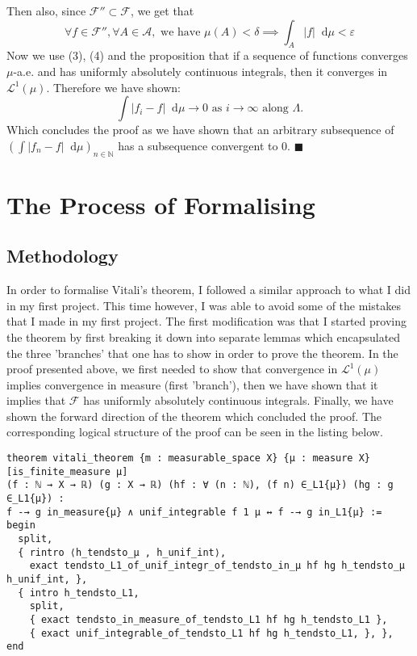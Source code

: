 \documentclass[11pt]{article}
\newenvironment{code}{\captionsetup{type=listing}}{}
\newcommand\N{\mathbb{N}}
\newcommand\Lmu{\mathcal{L}^1(\mu)}
\newcommand\weh{\text{ we have }}
\newcommand\as{\text{ as }}
\newcommand*\diff{\mathop{}\!\mathrm{d}}
\renewcommand\qedsymbol{$\blacksquare$}
\begin{document}
Then also, since $\mathcal{F}'' \subset \mathcal{F}$, we get that
\begin{equation}
\forall f \in \mathcal{F''},
  \forall A \in \mathcal{A}, \weh \mu(A) < \delta \implies \int_A |f|\diff \mu < \varepsilon
\end{equation}
Now we use (3), (4) and the proposition that if a sequence of functions converges $\mu$-a.e.
and has uniformly absolutely continuous integrals, then it converges in  $\Lmu$.
Therefore we have shown:
\[
  \int |f_{i} - f| \diff\mu \to 0 \as i \to \infty \text{ along } \Lambda
.\]
Which concludes the proof as we have shown that an arbitrary subsequence of
$(\int |f_{n} - f| \diff\mu)_{n\in\N} $ has a subsequence convergent to 0. \hfill \qedsymbol

\section*{The Process of Formalising}
\subsection*{Methodology}

In order to formalise Vitali's theorem, I followed a similar approach to what
I did in my first project. This time however, I was able to avoid some of the mistakes that
I made in my first project. The first modification was that I started proving the
theorem by first breaking it down into separate lemmas which encapsulated the
three 'branches' that one has to show in order to prove the theorem. In the proof
presented above, we first needed to show that
convergence in $\Lmu$ implies convergence in measure (first 'branch'), then we have shown that
it implies that  $\mathcal{F}$ has uniformly absolutely continuous integrals. Finally,
we have shown the forward direction of the theorem which concluded the proof.
The corresponding logical structure of the proof can be seen in the listing below.

\begin{code}
\begin{verbatim}
theorem vitali_theorem {m : measurable_space X} {μ : measure X} [is_finite_measure μ]
(f : ℕ → X → ℝ) (g : X → ℝ) (hf : ∀ (n : ℕ), (f n) ∈_L1{μ}) (hg : g ∈_L1{μ}) :
f -→ g in_measure{μ} ∧ unif_integrable f 1 μ ↔ f -→ g in_L1{μ} :=
begin
  split,
  { rintro ⟨h_tendsto_μ , h_unif_int⟩,
    exact tendsto_L1_of_unif_integr_of_tendsto_in_μ hf hg h_tendsto_μ  h_unif_int, },
  { intro h_tendsto_L1,
    split,
    { exact tendsto_in_measure_of_tendsto_L1 hf hg h_tendsto_L1 },
    { exact unif_integrable_of_tendsto_L1 hf hg h_tendsto_L1, }, },
end
\end{verbatim}
\end{code}
\end{document}
